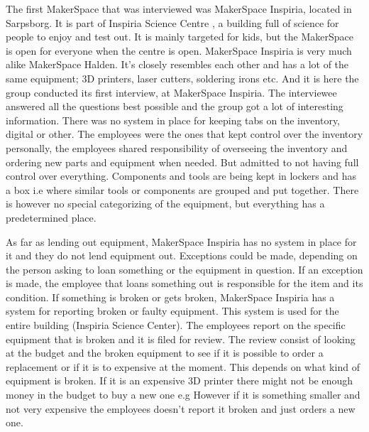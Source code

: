 The first MakerSpace that was interviewed was MakerSpace Inspiria, located in Sarpsborg. It is part of Inspiria Science Centre \cite{Inspiria-SC}, a building full of science for people to enjoy and test out. It is mainly targeted for kids, but the MakerSpace is open for everyone when the centre is open. MakerSpace Inspiria is very much alike MakerSpace Halden. It's closely resembles each other and has a lot of the same equipment; 3D printers, laser cutters, soldering irons etc. 
And it is here the group conducted its first interview, at MakerSpace Inspiria. The interviewee answered all the questions best possible and the group got a lot of interesting information. There was no system in place for keeping tabs on the inventory, digital or other. The employees were the ones that kept control over the inventory personally, the employees shared responsibility of overseeing the inventory and ordering new parts and equipment when needed. But admitted to not having full control over everything. Components and tools are being kept in lockers and has a box i.e where similar tools or components are grouped and put together. There is however no special categorizing of the equipment, but everything has a predetermined place. 

As far as lending out equipment, MakerSpace Inspiria has no system in place for it and they do not lend equipment out. Exceptions could be made, depending on the person asking to loan something or the equipment in question. If an exception is made, the employee that loans something out is responsible for the item and its condition. If something is broken or gets broken, MakerSpace Inspiria has a system for reporting broken or faulty equipment. This system is used for the entire building (Inspiria Science Center). The employees report on the specific equipment that is broken and it is filed for review. The review consist of looking at the budget and the broken equipment to see if it is possible to order a replacement or if it is to expensive at the moment. This depends on what kind of equipment is broken. If it is an expensive 3D printer there might not be enough money in the budget to buy a new one e.g However if it is something smaller and not very expensive the employees doesn't report it broken and just orders a new one. 

